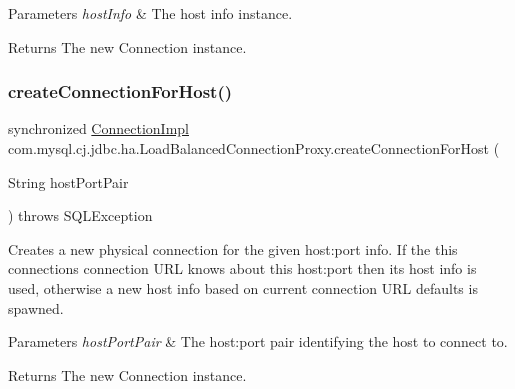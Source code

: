 \begin{DoxyParams}{Parameters}
{\em host\+Info} & The host info instance. \\
\hline
\end{DoxyParams}
\begin{DoxyReturn}{Returns}
The new Connection instance. 
\end{DoxyReturn}
\mbox{\label{classcom_1_1mysql_1_1cj_1_1jdbc_1_1ha_1_1_load_balanced_connection_proxy_a27662d65e82acb86f3cc6af3f4f331ee}} 
\subsubsection{\texorpdfstring{create\+Connection\+For\+Host()}{createConnectionForHost()}\hspace{0.1cm}{\footnotesize\ttfamily [2/2]}}
{\footnotesize\ttfamily synchronized \mbox{\hyperlink{classcom_1_1mysql_1_1cj_1_1jdbc_1_1_connection_impl}{Connection\+Impl}} com.\+mysql.\+cj.\+jdbc.\+ha.\+Load\+Balanced\+Connection\+Proxy.\+create\+Connection\+For\+Host (\begin{DoxyParamCaption}\item[{String}]{host\+Port\+Pair }\end{DoxyParamCaption}) throws S\+Q\+L\+Exception}

Creates a new physical connection for the given host\+:port info. If the this connection\textquotesingle{}s connection U\+RL knows about this host\+:port then its host info is used, otherwise a new host info based on current connection U\+RL defaults is spawned.


\begin{DoxyParams}{Parameters}
{\em host\+Port\+Pair} & The host\+:port pair identifying the host to connect to. \\
\hline
\end{DoxyParams}
\begin{DoxyReturn}{Returns}
The new Connection instance. 
\end{DoxyReturn}
\mbox{\label{classcom_1_1mysql_1_1cj_1_1jdbc_1_1ha_1_1_load_balanced_connection_proxy_afc3968a242b38d47fdd116d3fdb8ac73}} 
